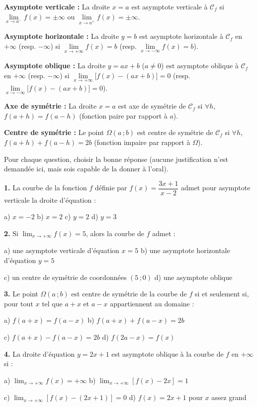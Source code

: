 \documentclass[11pt]{article}
\begin{document}
\begin{aretenir}
\textbf{Asymptote verticale :} La droite $x=a$ est asymptote verticale à $\mathcal{C}_f$ si $\lim\limits_{x\to a^-}f(x)=\pm\infty$ ou $\lim\limits_{x\to a^+}f(x)=\pm\infty$.

\textbf{Asymptote horizontale :} La droite $y=b$ est asymptote horizontale à $\mathcal{C}_f$ en $+\infty$ (resp. $-\infty$) si $\lim\limits_{x\to +\infty}f(x)=b$ (resp. $\lim\limits_{x\to -\infty}f(x)=b$).

\textbf{Asymptote oblique :} La droite $y=ax+b$ ($a\neq 0$) est asymptote oblique à $\mathcal{C}_f$ en $+\infty$ (resp. $-\infty$) si $\lim\limits_{x\to +\infty}\bigl[f(x)-(ax+b)\bigr]=0$ (resp. $\lim\limits_{x\to -\infty}\bigl[f(x)-(ax+b)\bigr]=0$).

\textbf{Axe de symétrie :} La droite $x=a$ est axe de symétrie de $\mathcal{C}_f$ si $\forall h$, $f(a+h)=f(a-h)$ (fonction paire par rapport à $a$).

\textbf{Centre de symétrie :} Le point $\Omega(a\,;b)$ est centre de symétrie de $\mathcal{C}_f$ si $\forall h$, $f(a+h)+f(a-h)=2b$ (fonction impaire par rapport à $\Omega$).
\end{aretenir}

\begin{exercice}
Pour chaque question, choisir la bonne réponse (aucune justification n'est demandée ici, mais sois capable de la donner à l'oral).

\textbf{1.} La courbe de la fonction $f$ définie par $f(x)=\dfrac{3x+1}{x-2}$ admet pour asymptote verticale la droite d'équation :

\quad a) $x=-2$ \qquad b) $x=2$ \qquad c) $y=2$ \qquad d) $y=3$

\textbf{2.} Si $\displaystyle\lim_{x\to +\infty}f(x)=5$, alors la courbe de $f$ admet :

\quad a) une asymptote verticale d'équation $x=5$ \qquad b) une asymptote horizontale d'équation $y=5$

\quad c) un centre de symétrie de coordonnées $(5\,;0)$ \qquad d) une asymptote oblique

\textbf{3.} Le point $\Omega(a\,;b)$ est centre de symétrie de la courbe de $f$ si et seulement si, pour tout $x$ tel que $a+x$ et $a-x$ appartiennent au domaine :

\quad a) $f(a+x)=f(a-x)$ \qquad b) $f(a+x)+f(a-x)=2b$

\quad c) $f(a+x)-f(a-x)=2b$ \qquad d) $f(2a-x)=f(x)$

\textbf{4.} La droite d'équation $y=2x+1$ est asymptote oblique à la courbe de $f$ en $+\infty$ si :

\quad a) $\displaystyle\lim_{x\to+\infty}f(x)=+\infty$ \qquad b) $\displaystyle\lim_{x\to+\infty}[f(x)-2x]=1$

\quad c) $\displaystyle\lim_{x\to+\infty}[f(x)-(2x+1)]=0$ \qquad d) $f(x)=2x+1$ pour $x$ assez grand
\end{exercice}
\end{document}
